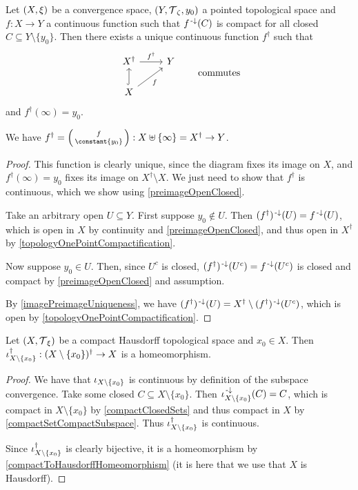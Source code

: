\begin{proposition} \label{universalPropertyAlexandroffCompactification}
Let $\sSet{X, \xi}$ be a convergence space, $\sSet{Y,\topology_\zeta, y_0}$ a pointed topological space and $f: X\to Y$ a continuous function such that $f^{\text{\hspace{0.15em}-}\downarrow}(C)$ is compact for all closed $C\subseteq Y\setminus\{y_0\}$. Then there exists a unique continuous function $f^\dagger$ such that
\[ \begin{tikzcd}
X^\dagger \ar[r, "{f^\dagger}"] & Y \\
X \ar[u, hook] \ar[ur, swap, "f"]
\end{tikzcd} \qquad \text{commutes} \]
and $f^\dagger(\infty) = y_0$.
\end{proposition}
We have $f^\dagger = \left(\begin{smallmatrix}
f \\ \constant{y_0}
\end{smallmatrix}\right): X\uplus \{\infty\} = X^\dagger \to Y$.
\begin{proof}
This function is clearly unique, since the diagram fixes its image on $X$, and $f^\dagger(\infty) = y_0$ fixes its image on $X^\dagger \setminus X$. We just need to show that $f^\dagger$ is continuous, which we show using \ref{preimageOpenClosed}.

Take an arbitrary open $U\subseteq Y$. First suppose $y_0\notin U$. Then $(f^\dagger)^{\text{\hspace{0.15em}-}\downarrow}(U) = f^{\text{\hspace{0.15em}-}\downarrow}(U)$, which is open in $X$ by continuity and \ref{preimageOpenClosed}, and thus open in $X^\dagger$ by \ref{topologyOnePointCompactification}.

Now suppose $y_0\in U$. Then, since $U^c$ is closed, $(f^\dagger)^{{\text{\hspace{0.15em}-}\downarrow}}(U^c) = f^{\text{\hspace{0.15em}-}\downarrow}(U^c)$ is closed and compact by \ref{preimageOpenClosed} and assumption.

By \ref{imagePreimageUniqueness}, we have $(f^\dagger)^{\text{\hspace{0.15em}-}\downarrow}(U) = X^\dagger \setminus (f^\dagger)^{\text{\hspace{0.15em}-}\downarrow}(U^c)$, which is open by \ref{topologyOnePointCompactification}.
\end{proof}
\begin{corollary} \label{onePointDeletionAndCompactificationInverseOperations}
Let $\sSet{X,\topology_\xi}$ be a compact Hausdorff topological space and $x_0\in X$. Then $\operatorname{\iota}_{X\setminus\{x_0\}}^\dagger: (X\setminus\{x_0\})^\dagger\to X$ is a homeomorphism.
\end{corollary}
\begin{proof}
We have that $\operatorname{\iota}_{X\setminus\{x_0\}}$ is continuous by definition of the subspace convergence. Take some closed $C\subseteq X\setminus\{x_0\}$. Then $\operatorname{\iota}_{X\setminus\{x_0\}}^{{\text{\hspace{0.15em}-}\downarrow}}(C) = C$, which is compact in $X\setminus\{x_0\}$ by \ref{compactClosedSets} and thus compact in $X$ by \ref{compactSetCompactSubspace}. Thus $\operatorname{\iota}_{X\setminus\{x_0\}}^\dagger$ is continuous.

Since $\operatorname{\iota}_{X\setminus\{x_0\}}^\dagger$ is clearly bijective, it is a homeomorphism by \ref{compactToHausdorffHomeomorphism} (it is here that we use that $X$ is Hausdorff).
\end{proof}

